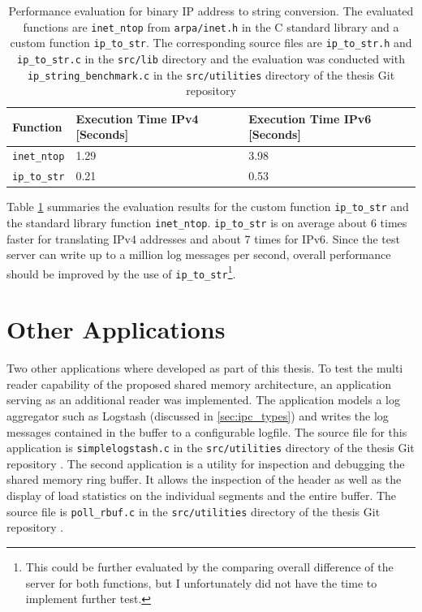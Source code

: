 \begin{table}[h!]
    \centering
    \small
    \begin{tabular}{lll}
        \toprule
        \textbf{Function} & \textbf{Execution Time IPv4 [Seconds]} & \textbf{Execution Time IPv6 [Seconds]} \\ \midrule 
        \texttt{inet\_ntop} & 1.29 & 3.98 \\ \midrule
        \texttt{ip\_to\_str} & 0.21 & 0.53 \\ 
        \bottomrule
    \end{tabular}
    \caption[IP String Conversion]{Performance evaluation for binary IP address to string conversion. The evaluated functions are
    \texttt{inet\_ntop} from \texttt{arpa/inet.h} in the C standard library and a custom function \texttt{ip\_to\_str}. The corresponding source 
    files are \texttt{ip\_to\_str.h}
    and \texttt{ip\_to\_str.c} in the \texttt{src/lib} directory and the evaluation was conducted with
    \texttt{ip\_string\_benchmark.c} in the \texttt{src/utilities} directory of the thesis Git repository \cite{gitlab}}
    \label{tab:ip_str}
\end{table}

Table \ref{tab:ip_str} summaries the evaluation results for the custom function \texttt{ip\_to\_str} and the standard library function \texttt{inet\_ntop}. 
\texttt{ip\_to\_str} is on average about 6 times faster for translating \ac{IPv4} addresses and about 7 times for \ac{IPv6}. Since the test server
can write up to a million log messages per second, overall performance should be improved by the use of \texttt{ip\_to\_str}\footnote{This could be further evaluated by the comparing overall difference of the server for both functions, but I unfortunately did not have the time to implement further test.}. 

\section{Other Applications}

Two other applications where developed as part of this thesis. To test the multi reader capability of the proposed
shared memory architecture, an application serving as an additional reader was implemented. The application models a 
log aggregator such as Logstash (discussed in \ref{sec:ipc_types}) and writes the log messages contained in the buffer to a configurable 
logfile. The source file for this application is \texttt{simplelogstash.c} in the \texttt{src/utilities} directory of the thesis Git repository \cite{gitlab}.
The second application is a utility for inspection and debugging the shared memory ring buffer. It allows the inspection of the header as well
as the display of load statistics on the individual segments and the entire buffer. The source file is \texttt{poll\_rbuf.c} in the \texttt{src/utilities} directory of the thesis Git repository \cite{gitlab}. 

